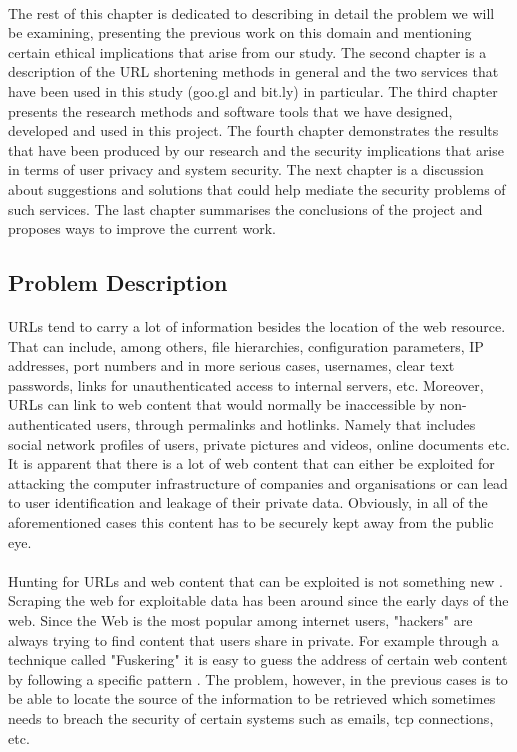 \documentclass[12pt]{article}
\begin{document}
\paragraph{} 
The rest of this chapter is dedicated to describing in detail the problem we will be examining, presenting the previous work on this domain and mentioning certain ethical implications that arise from our study. The second chapter is a description of the URL shortening methods in general and the two services that have been used in this study (goo.gl and bit.ly) in particular. The third chapter presents the research methods and software tools that we have designed, developed and used in this project. The fourth chapter demonstrates the results that have been produced by our research and the security implications that arise in terms of user privacy and system security. The next chapter is a discussion about suggestions and solutions that could help mediate the security problems of such services. The last chapter summarises the conclusions of the project and proposes ways to improve the current work. 
\subsection{Problem Description}

\paragraph{}
URLs tend to carry a lot of information besides the location of the web resource. That can include, among others, file hierarchies, configuration parameters, IP addresses, port numbers and in more serious cases, usernames, clear text passwords, links for unauthenticated access to internal servers, etc. Moreover, URLs can link to web content that would normally be inaccessible by non-authenticated users, through permalinks and hotlinks. Namely that includes social network profiles of users, private pictures and videos, online documents etc. It is apparent that there is a lot of web content that can either be exploited for attacking the computer infrastructure of companies and organisations or can lead to user identification and leakage of their private data. Obviously, in all of the aforementioned cases this content has to be securely kept away from the public eye.
\paragraph{}
Hunting for URLs and web content that can be exploited is not something new \cite{semantic}. Scraping the web for exploitable data has been around since the early days of the web. Since the Web is the most popular among internet users, "hackers" are always trying to find content that users share in private. For example through a technique called "Fuskering" it is easy to guess the address of certain web content by following a specific pattern \cite{fusker}. The problem, however, in the previous cases  is to be able to locate the source of the information to be retrieved which sometimes needs to breach the security of certain systems such as emails, tcp connections, etc.
\end{document}
